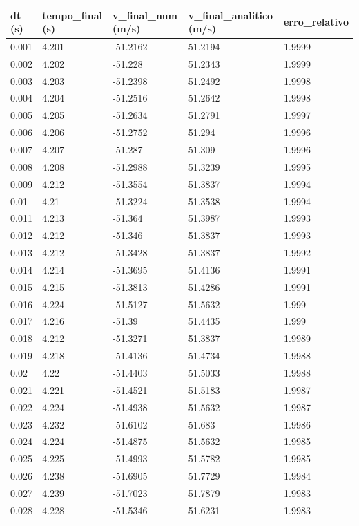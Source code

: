 \begin{tabular}{lllll}
\toprule
dt (s) & tempo\_final (s) & v\_final\_num (m/s) & v\_final\_analitico (m/s) & erro\_relativo \\
\midrule
0.001 & 4.201 & -51.2162 & 51.2194 & 1.9999 \\
0.002 & 4.202 & -51.228 & 51.2343 & 1.9999 \\
0.003 & 4.203 & -51.2398 & 51.2492 & 1.9998 \\
0.004 & 4.204 & -51.2516 & 51.2642 & 1.9998 \\
0.005 & 4.205 & -51.2634 & 51.2791 & 1.9997 \\
0.006 & 4.206 & -51.2752 & 51.294 & 1.9996 \\
0.007 & 4.207 & -51.287 & 51.309 & 1.9996 \\
0.008 & 4.208 & -51.2988 & 51.3239 & 1.9995 \\
0.009 & 4.212 & -51.3554 & 51.3837 & 1.9994 \\
0.01 & 4.21 & -51.3224 & 51.3538 & 1.9994 \\
0.011 & 4.213 & -51.364 & 51.3987 & 1.9993 \\
0.012 & 4.212 & -51.346 & 51.3837 & 1.9993 \\
0.013 & 4.212 & -51.3428 & 51.3837 & 1.9992 \\
0.014 & 4.214 & -51.3695 & 51.4136 & 1.9991 \\
0.015 & 4.215 & -51.3813 & 51.4286 & 1.9991 \\
0.016 & 4.224 & -51.5127 & 51.5632 & 1.999 \\
0.017 & 4.216 & -51.39 & 51.4435 & 1.999 \\
0.018 & 4.212 & -51.3271 & 51.3837 & 1.9989 \\
0.019 & 4.218 & -51.4136 & 51.4734 & 1.9988 \\
0.02 & 4.22 & -51.4403 & 51.5033 & 1.9988 \\
0.021 & 4.221 & -51.4521 & 51.5183 & 1.9987 \\
0.022 & 4.224 & -51.4938 & 51.5632 & 1.9987 \\
0.023 & 4.232 & -51.6102 & 51.683 & 1.9986 \\
0.024 & 4.224 & -51.4875 & 51.5632 & 1.9985 \\
0.025 & 4.225 & -51.4993 & 51.5782 & 1.9985 \\
0.026 & 4.238 & -51.6905 & 51.7729 & 1.9984 \\
0.027 & 4.239 & -51.7023 & 51.7879 & 1.9983 \\
0.028 & 4.228 & -51.5346 & 51.6231 & 1.9983 \\

\end{tabular}
